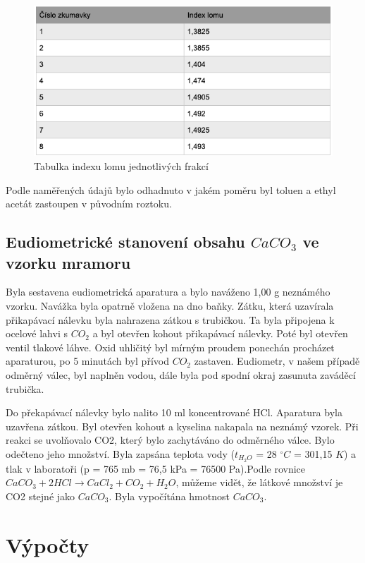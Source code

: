 \documentclass[13pt, a4paper, twoside]{article}
\begin{document}
\begin{figure}[H]
    \centering
    \includegraphics[width=6.5in]{uloha_8_tab_3.png}
    \caption*{Tabulka indexu lomu jednotlivých frakcí}
\end{figure}

Podle naměřených údajů bylo odhadnuto v jakém poměru byl toluen a ethyl acetát zastoupen v původním roztoku.

\subsection*{Eudiometrické stanovení obsahu $CaCO_3$ ve vzorku mramoru}
Byla sestavena eudiometrická aparatura  a bylo naváženo 1,00 g neznámého vzorku. Navážka byla opatrně vložena na dno baňky. Zátku, která uzavírala přikapávací nálevku byla nahrazena zátkou s trubičkou. Ta byla připojena k ocelové lahvi s $CO_2$ a byl otevřen kohout přikapávací nálevky. Poté byl otevřen ventil tlakové láhve. Oxid uhličitý byl mírným proudem ponechán procházet aparaturou, po 5 minutách byl přívod $CO_2$ zastaven. Eudiometr, v našem případě odměrný válec, byl naplněn vodou, dále byla pod spodní okraj zasunuta zaváděcí trubička.


Do překapávací nálevky bylo nalito 10 ml koncentrované HCl. Aparatura byla uzavřena zátkou. Byl otevřen kohout a kyselina nakapala na neznámý vzorek. Při reakci se uvolňovalo CO2, který bylo zachytáváno do odměrného válce. Bylo odečteno jeho množství. Byla zapsána teplota vody ($t_{H_2O}$ = 28 $^{\circ}C$ = 301,15 $K$) a tlak v laboratoři (p = 765 mb = 76,5 kPa = 76500 Pa).Podle rovnice $CaCO_3 + 2HCl \to CaCl_2 + CO_2 + H_2O$, můžeme vidět, že látkové množství je CO2 stejné jako $CaCO_3$. Byla vypočítána hmotnost $CaCO_3$.

\section*{Výpočty}
\end{document}

